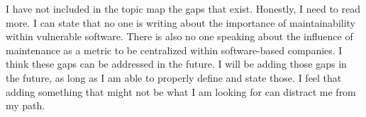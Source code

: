 \documentclass[article]{IEEEtran}
\begin{document}
I have not included in the topic map the gaps that exist. Honestly, I need to read more. I can state that no one is writing about the importance of maintainability within vulnerable software. There is also no one speaking about the influence of maintenance as a metric to be centralized within software-based companies. I think these gaps can be addressed in the future. I will be adding those gaps in the future, as long as I am able to properly define and state those. I feel that adding something that might not be what I am looking for can distract me from my path.



\end{document}
